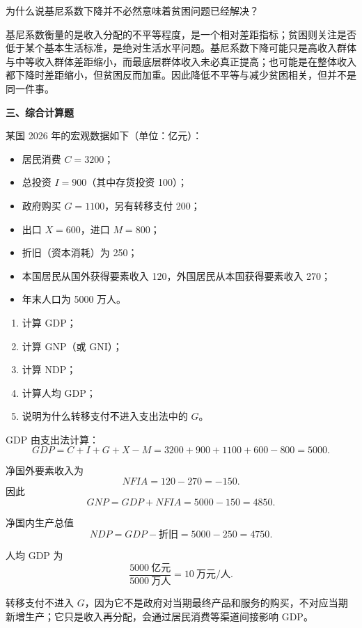 \begin{question}
为什么说基尼系数下降并不必然意味着贫困问题已经解决？

\begin{solution}
基尼系数衡量的是收入分配的不平等程度，是一个相对差距指标；贫困则关注是否低于某个基本生活标准，是绝对生活水平问题。基尼系数下降可能只是高收入群体与中等收入群体差距缩小，而最底层群体收入未必真正提高；也可能是在整体收入都下降时差距缩小，但贫困反而加重。因此降低不平等与减少贫困相关，但并不是同一件事。
\end{solution}
\end{question}

\textbf{三、综合计算题}

\begin{question}
某国 2026 年的宏观数据如下（单位：亿元）：

\begin{itemize}[leftmargin=2em,itemsep=0.2em,topsep=0.2em]
  \item 居民消费 $C=3200$；
  \item 总投资 $I=900$（其中存货投资 100）；
  \item 政府购买 $G=1100$，另有转移支付 200；
  \item 出口 $X=600$，进口 $M=800$；
  \item 折旧（资本消耗）为 250；
  \item 本国居民从国外获得要素收入 120，外国居民从本国获得要素收入 270；
  \item 年末人口为 5000 万人。
\end{itemize}

\begin{enumerate}[label=(\arabic*),leftmargin=2.5em]
  \item 计算 GDP；
  \item 计算 GNP（或 GNI）；
  \item 计算 NDP；
  \item 计算人均 GDP；
  \item 说明为什么转移支付不进入支出法中的 $G$。
\end{enumerate}

\begin{solution}
GDP 由支出法计算：
\[
GDP=C+I+G+X-M=3200+900+1100+600-800=5000.
\]

净国外要素收入为
\[
NFIA=120-270=-150.
\]
因此
\[
GNP=GDP+NFIA=5000-150=4850.
\]

净国内生产总值
\[
NDP=GDP-\text{折旧}=5000-250=4750.
\]

人均 GDP 为
\[
\frac{5000\ \text{亿元}}{5000\ \text{万人}}
=10\ \text{万元/人}.
\]

转移支付不进入 $G$，因为它不是政府对当期最终产品和服务的购买，不对应当期新增生产；它只是收入再分配，会通过居民消费等渠道间接影响 GDP。
\end{solution}
\end{question}

